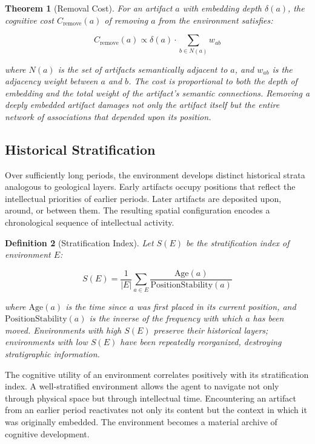 \documentclass[12pt,oneside]{article}
\newtheorem{definition}{Definition}[section]
\newtheorem{theorem}[definition]{Theorem}
\theoremstyle{remark}
\begin{document}
\begin{theorem}[Removal Cost]
For an artifact $a$ with embedding depth $\delta(a)$, the cognitive cost $C_{\text{remove}}(a)$ of removing $a$ from the environment satisfies:

\begin{equation}
C_{\text{remove}}(a) \propto \delta(a) \cdot \sum_{b \in N(a)} w_{ab}
\end{equation}

where $N(a)$ is the set of artifacts semantically adjacent to $a$, and $w_{ab}$ is the adjacency weight between $a$ and $b$. The cost is proportional to both the depth of embedding and the total weight of the artifact's semantic connections. Removing a deeply embedded artifact damages not only the artifact itself but the entire network of associations that depended upon its position.
\end{theorem}

\subsection{Historical Stratification}

Over sufficiently long periods, the environment develops distinct historical strata analogous to geological layers. Early artifacts occupy positions that reflect the intellectual priorities of earlier periods. Later artifacts are deposited upon, around, or between them. The resulting spatial configuration encodes a chronological sequence of intellectual activity.

\begin{definition}[Stratification Index]
Let $S(E)$ be the stratification index of environment $E$:

\begin{equation}
S(E) = \frac{1}{|E|} \sum_{a \in E} \frac{\text{Age}(a)}{\text{PositionStability}(a)}
\end{equation}

where $\text{Age}(a)$ is the time since $a$ was first placed in its current position, and $\text{PositionStability}(a)$ is the inverse of the frequency with which $a$ has been moved. Environments with high $S(E)$ preserve their historical layers; environments with low $S(E)$ have been repeatedly reorganized, destroying stratigraphic information.
\end{definition}

The cognitive utility of an environment correlates positively with its stratification index. A well-stratified environment allows the agent to navigate not only through physical space but through intellectual time. Encountering an artifact from an earlier period reactivates not only its content but the context in which it was originally embedded. The environment becomes a material archive of cognitive development.
\end{document}
